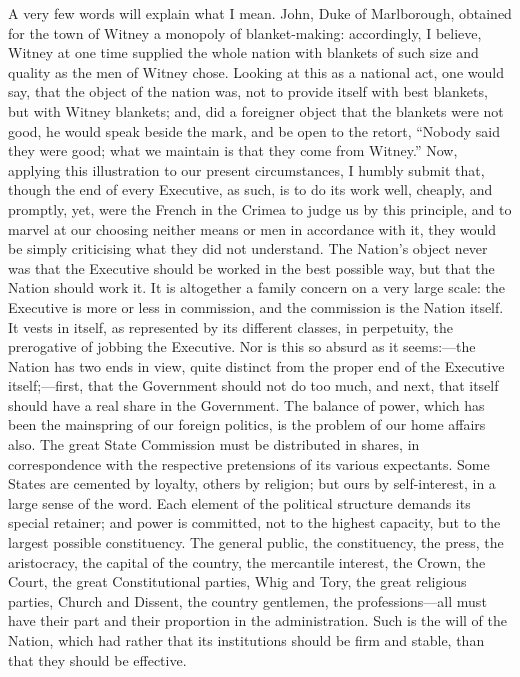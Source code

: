 A very few words will explain what I mean. John,
Duke of Marlborough, obtained for the town of Witney a monopoly
of blanket-making: accordingly, I believe, Witney at one time supplied
the whole nation with blankets of such size and quality as the men of
Witney chose. Looking at this as a national act, one would say, that
the object of the nation was, not to provide itself with best
blankets, but with Witney blankets; and, did a foreigner object that
the blankets were not good, he would speak beside the mark, and be
open to the retort, ``Nobody said they were good; what we maintain is
that they come from Witney.'' Now, applying this illustration to our
present circumstances, I humbly submit that, though the end of every
Executive, as such, is to do its work well, cheaply, and promptly,
yet, were the French in the Crimea to judge us by this principle, and
to marvel at our choosing neither means or men in accordance with it,
they would be simply criticising what they did not understand. The
Nation's object never was that the Executive should be worked in the
best possible way, but that the Nation should work it. It is
altogether a family concern on a very large scale: the Executive is
more or less in commission, and the commission is the Nation itself.
It vests in itself, as represented by its different classes, in
perpetuity, the prerogative of jobbing the Executive. Nor is this so
absurd as it seems:—the Nation has two ends in view, quite distinct
from the proper end of the Executive itself;—first, that the
Government should not do too much, and next, that itself should have a
real share in the Government. The balance of power, which has been the
mainspring of our foreign politics, is the problem of our home affairs
also. The great State Commission must be distributed in shares, in
correspondence with the respective pretensions of its various
expectants. Some States are cemented by loyalty, others by religion;
but ours by self-interest, in a large sense of the word. Each
element of the political structure demands its special retainer; and
power is committed, not to the highest capacity, but to the largest
possible constituency. The general public, the constituency, the
press, the aristocracy, the capital of the country, the mercantile
interest, the Crown, the Court, the great Constitutional parties, Whig
and Tory, the great religious parties, Church and Dissent, the country
gentlemen, the professions—all must have their part and their
proportion in the administration. Such is the will of the Nation,
which had rather that its institutions should be firm and stable, than
that they should be effective.

